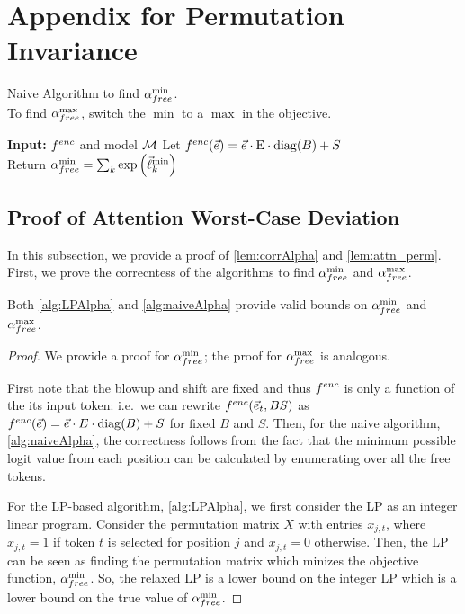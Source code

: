 \section{Appendix for Permutation Invariance}
\label{sec:appendix_perm}

\begin{algorithm}[tb] 
	\caption{Naive Algorithm to find ${\alpha}_{free}^{\min}$.\\
		To find ${\alpha}_{free}^{\max}$, switch the $\min$ to a $\max$ in the objective.
	}
	\label{alg:naiveAlpha}
	\begin{algorithmic}
	\STATE \textbf{Input:} {$f^{enc}$ and model $\mathcal{M}$}
	Let $f^{enc}(\vec{e}) = \vec{e} \cdot \text{E} \cdot \mathrm{diag}(B) + S$ \\
	\FOR{$k \in (\ndes, \nctx]$}
	\ENDFOR
	\STATE Return ${\alpha}_{free}^{\min} = \sum_k \exp\left(\vec{\ell}^{\min}_k\right)$
	\end{algorithmic}
\end{algorithm}

\subsection{Proof of Attention Worst-Case Deviation}
In this subsection, we provide a proof of \cref{lem:corrAlpha} and \cref{lem:attn_perm}.
First, we prove the correcntess of the algorithms to find ${\alpha}_{free}^{\min}$ and ${\alpha}_{free}^{\max}$.
\begin{lemma}
	 Both \cref{alg:LPAlpha} and \cref{alg:naiveAlpha} provide valid bounds on ${\alpha}_{free}^{\min}$ and ${\alpha}_{free}^{\max}$.
\end{lemma}
\begin{proof}
	We provide a proof for ${\alpha}_{free}^{\min}$; the proof for ${\alpha}_{free}^{\max}$ is analogous.

	First note that the blowup and shift are fixed and thus $f^{enc}$ is only a function of the its input token: i.e.\ we can rewrite $f^{enc}(\vec{e}_t, BS)$ as $f^{enc}(\vec{e}) = \vec{e} \cdot E \cdot \mathrm{diag}(B) + S$ for fixed $B$ and $S$.
	Then, for the naive algorithm, \cref{alg:naiveAlpha}, the correctness follows from the fact that the minimum possible logit value from each position can be calculated by enumerating over all the free tokens.

	For the LP-based algorithm, \cref{alg:LPAlpha}, we first consider the LP as an integer linear program.
	Consider the permutation matrix $X$ with entries $x_{j, t}$, where $x_{j, t} = 1$ if token $t$ is selected for position $j$ and $x_{j, t} = 0$ otherwise.
	Then, the LP can be seen as finding the permutation matrix which minizes the objective function, ${\alpha}_{free}^{\min}$.
	So, the relaxed LP is a lower bound on the integer LP which is a lower bound on the true value of ${\alpha}_{free}^{\min}$.
\end{proof}

